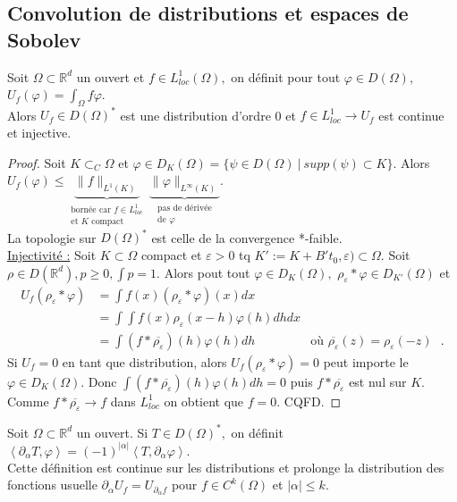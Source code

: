 \subsection{Convolution de distributions et espaces de Sobolev}
\begin{definition}
    Soit $\Omega\subset \mathbb{R} ^d$ un ouvert et $f\in L^1_{loc}(\Omega),$ on définit pour tout $\varphi \in D(\Omega),$ $U_f(\varphi )=\int_\Omega f \varphi $.\\
    Alors $U_f\in D(\Omega)^*$ est une distribution d'ordre 0 et $f\in L^1_{loc}\to U_f$ est continue et injective.
\end{definition}
\begin{proof}
    Soit $K\subset _C\Omega$ et $\varphi \in D_K(\Omega)=\{\psi\in D(\Omega)\ |\ supp(\psi)\subset K\} .$ Alors $U_f(\varphi )\le \underbrace{\|f\|_{L^1(K)}}_{{\substack{\text{bornée car }f\in L^1_{loc}\\\text{et }K \text{ compact}}}}\ \underbrace{\|\varphi \|_{L^\infty (K)}}_{{\substack{\text{pas de dérivée}\\\text{de }\varphi }}}$.\\
    La topologie sur $D(\Omega)^*$ est celle de la convergence *-faible. \\
    \underline{Injectivité :} Soit $K\subset \Omega$ compact et $\varepsilon >0$ tq $K':=K+B't_0,\varepsilon )\subset \Omega.$ Soit $\rho\in D(\mathbb{R} ^d), p\ge 0,\int p=1.$ Alors pout tout $\varphi \in D_K(\Omega),$ $\rho_\varepsilon *\varphi \in D_{K'}(\Omega)$ et
    \begin{align*}
        U_f(\rho_\varepsilon *\varphi ) &= \int f(x)\left( \rho_\varepsilon *\varphi  \right) (x)dx\\
                                        &= \int \int f(x)\rho_\varepsilon (x-h)\varphi (h)dhdx\\
                                        &= \int \left( f*\overline{\rho_\varepsilon } \right) (h)\varphi (h)dh &\text{où $\overline{\rho_\varepsilon }(z)=\rho_\varepsilon (-z)$ }.
    \end{align*}
    Si $U_f=0$ en tant que distribution, alors $U_f(\rho_\varepsilon *\varphi )=0$ peut importe le $\varphi \in D_K(\Omega).$ Donc $\int\left( f*\overline{\rho_\varepsilon } \right) (h)\varphi (h)dh=0$ puis $f*\overline{\rho_\varepsilon }$ est nul sur $K.$ Comme $f*\overline{\rho_\varepsilon }\to f$ dans $L^1_{loc}$ on obtient que $f=0.$ CQFD.
\end{proof}
\begin{definition}
     Soit $\Omega\subset \mathbb{R} ^d$ un ouvert. Si $T\in D(\Omega)^*,$ on définit $\left<\partial_\alpha  T,\varphi  \right> =\left( -1 \right)^{|\alpha | }\left<T, \partial_\alpha \varphi  \right>. $ \\
     Cette définition est continue sur les distributions et prolonge la distribution des fonctions usuelle $\partial_\alpha U_f=U_{\partial_\alpha f}$ pour $f\in C^k(\Omega)$ et $|\alpha | \le k.$
\end{definition}
